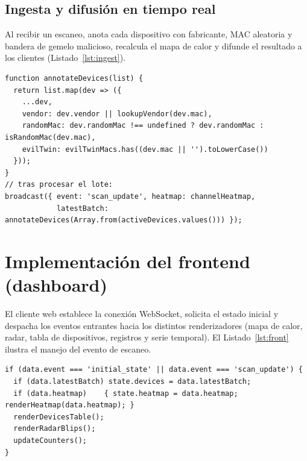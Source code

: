 \subsection{Ingesta y difusión en tiempo real}
Al recibir un escaneo,  anota cada dispositivo con fabricante, MAC aleatoria y bandera de gemelo malicioso, recalcula el mapa de calor y difunde el resultado a los clientes (Listado~\ref{lst:ingest}).

\begin{lstlisting}[style=js,caption={Anotación y difusión (server.js)},label={lst:ingest}]
function annotateDevices(list) {
  return list.map(dev => ({
    ...dev,
    vendor: dev.vendor || lookupVendor(dev.mac),
    randomMac: dev.randomMac !== undefined ? dev.randomMac : isRandomMac(dev.mac),
    evilTwin: evilTwinMacs.has((dev.mac || '').toLowerCase())
  }));
}
// tras procesar el lote:
broadcast({ event: 'scan_update', heatmap: channelHeatmap,
            latestBatch: annotateDevices(Array.from(activeDevices.values())) });
\end{lstlisting}

\section{Implementación del frontend (dashboard)}
El cliente web establece la conexión WebSocket, solicita el estado inicial y despacha los eventos entrantes hacia los distintos renderizadores (mapa de calor, radar, tabla de dispositivos, registros y serie temporal). El Listado~\ref{lst:front} ilustra el manejo del evento de escaneo.

\begin{lstlisting}[style=js,caption={Manejo de eventos en el cliente (public/app.js)},label={lst:front}]
if (data.event === 'initial_state' || data.event === 'scan_update') {
  if (data.latestBatch) state.devices = data.latestBatch;
  if (data.heatmap)    { state.heatmap = data.heatmap; renderHeatmap(data.heatmap); }
  renderDevicesTable();
  renderRadarBlips();
  updateCounters();
}
\end{lstlisting}

